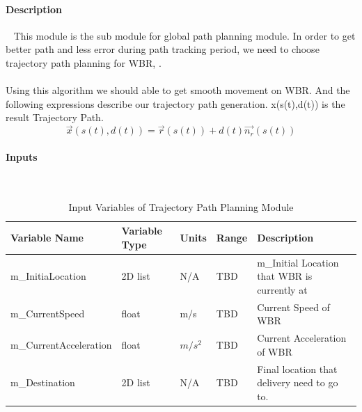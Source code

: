 \documentclass[12pt]{article}
\begin{document}
            \paragraph{Description} 
                ~\newline
                This module is the sub module for global path planning module. In order to get better path and less error during path tracking period, we need to choose trajectory path planning for WBR, \cite{inproceedings}. \\\\
                Using this algorithm we should able to get smooth movement on WBR.
                And the following expressions describe our trajectory path generation. x(s(t),d(t)) is the result Trajectory Path.
                \[
                    \vec{x}(s(t),d(t))=\vec{r}(s(t))+d(t)\vec{n_r}(s(t))
                \]
                
            \paragraph{Inputs}
                ~\newline
                \begin{table}[H]
                  \centering
                    \caption{Input Variables of Trajectory Path Planning Module} \label{tbl:Input Variables of Trajectory Path Planning Module}
                  \begin{tabularx}{\textwidth}{|p{5cm}|p{2cm}|p{1.2cm}|p{1cm}|X|}
                    \hline Variable Name & Variable Type & Units & Range & Description \\
                    \hline m\_InitiaLocation & 2D list &  N/A & TBD & m\_Initial Location that WBR is currently at\\
                    \hline m\_CurrentSpeed  & float & m/s & TBD & Current Speed of WBR\\
                    \hline m\_CurrentAcceleration & float & $m/s^2$ & TBD & Current Acceleration of WBR\\
                    \hline m\_Destination & 2D list  & N/A & TBD & Final location that delivery need to go to.\\
                    \hline
                  \end{tabularx}
                \end{table}
            
\end{document}
